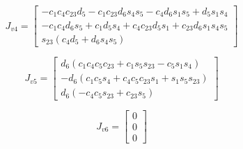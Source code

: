 \begin{equation}
J_{v4} = \left[\begin{matrix}- c_{1} c_{4} c_{23} d_{5} - c_{1} c_{23} d_{6} s_{4} s_{5} - c_{4} d_{6} s_{1} s_{5} + d_{5} s_{1} s_{4}\\- c_{1} c_{4} d_{6} s_{5} + c_{1} d_{5} s_{4} + c_{4} c_{23} d_{5} s_{1} + c_{23} d_{6} s_{1} s_{4} s_{5}\\s_{23} \left(c_{4} d_{5} + d_{6} s_{4} s_{5}\right)\end{matrix}\right]
\end{equation}

\begin{equation}
J_{v5} = \left[\begin{matrix}d_{6} \left(c_{1} c_{4} c_{5} c_{23} + c_{1} s_{5} s_{23} - c_{5} s_{1} s_{4}\right)\\- d_{6} \left(c_{1} c_{5} s_{4} + c_{4} c_{5} c_{23} s_{1} + s_{1} s_{5} s_{23}\right)\\d_{6} \left(- c_{4} c_{5} s_{23} + c_{23} s_{5}\right)\end{matrix}\right]
\end{equation}

\begin{equation}
J_{v6} = \left[\begin{matrix}0\\0\\0\end{matrix}\right]
\end{equation}
